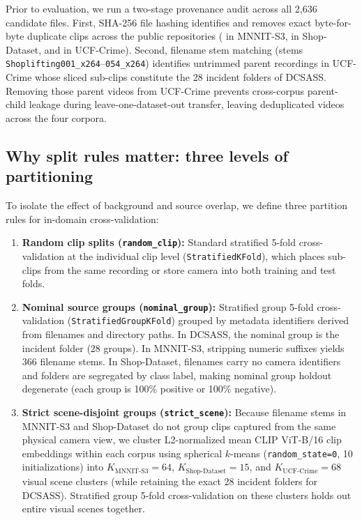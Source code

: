 \documentclass[pdflatex,sn-mathphys-num]{sn-jnl}
\begin{document}
Prior to evaluation, we run a two-stage provenance audit across all 2,636 candidate files. First, SHA-256 file hashing identifies and removes \DupTotal{} exact byte-for-byte duplicate clips across the public repositories (\DupMNNIT{} in MNNIT-S3, \DupShop{} in Shop-Dataset, and \DupUCF{} in UCF-Crime). Second, filename stem matching (stems \texttt{Shoplifting001\_x264}--\texttt{054\_x264}) identifies \ParentUCF{} untrimmed parent recordings in UCF-Crime whose sliced sub-clips constitute the 28 incident folders of DCSASS. Removing those \ParentUCF{} parent videos from UCF-Crime prevents cross-corpus parent-child leakage during leave-one-dataset-out transfer, leaving \TotalClips{} deduplicated videos across the four corpora.

\TableCorpora

\subsection{Why split rules matter: three levels of partitioning}

To isolate the effect of background and source overlap, we define three partition rules for in-domain cross-validation:
\begin{enumerate}
    \item \textbf{Random clip splits (\texttt{random\_clip}):} Standard stratified 5-fold cross-validation at the individual clip level (\texttt{StratifiedKFold}), which places sub-clips from the same recording or store camera into both training and test folds.
    \item \textbf{Nominal source groups (\texttt{nominal\_group}):} Stratified group 5-fold cross-validation (\texttt{Stratified\allowbreak Group\allowbreak KFold}) grouped by metadata identifiers derived from filenames and directory paths. In DCSASS, the nominal group is the incident folder (28 groups). In MNNIT-S3, stripping numeric suffixes yields 366 filename stems. In Shop-Dataset, filenames carry no camera identifiers and folders are segregated by class label, making nominal group holdout degenerate (each group is 100\% positive or 100\% negative).
    \item \textbf{Strict scene-disjoint groups (\texttt{strict\_scene}):} Because filename stems in MNNIT-S3 and Shop-Dataset do not group clips captured from the same physical camera view, we cluster L2-normalized mean CLIP ViT-B/16 clip embeddings within each corpus using spherical $k$-means (\texttt{random\_state=0}, 10 initializations) into $K_{\text{MNNIT-S3}}=64$, $K_{\text{Shop-Dataset}}=15$, and $K_{\text{UCF-Crime}}=68$ visual scene clusters (while retaining the exact 28 incident folders for DCSASS). Stratified group 5-fold cross-validation on these clusters holds out entire visual scenes together.
\end{enumerate}
\end{document}
